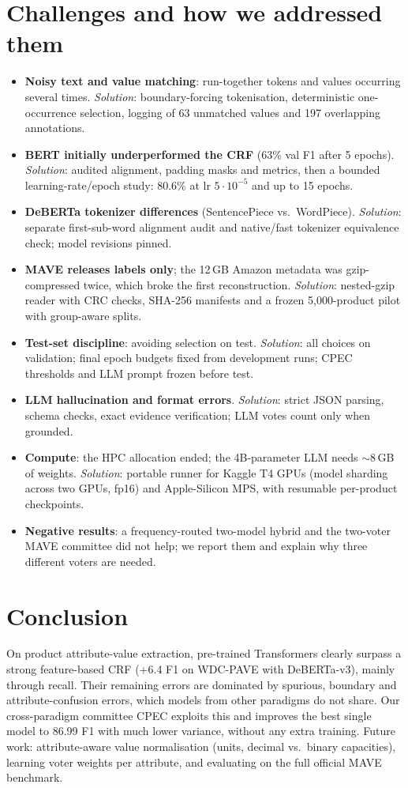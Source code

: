 \documentclass[10pt,twocolumn,a4paper]{article}
\begin{document}
\section{Challenges and how we addressed them}
\begin{itemize}
\item \textbf{Noisy text and value matching}: run-together tokens and values occurring several times. \emph{Solution}: boundary-forcing tokenisation, deterministic one-occurrence selection, logging of 63 unmatched values and 197 overlapping annotations.
\item \textbf{BERT initially underperformed the CRF} (63\% val F1 after 5 epochs). \emph{Solution}: audited alignment, padding masks and metrics, then a bounded learning-rate/epoch study: 80.6\% at lr $5\cdot10^{-5}$ and up to 15 epochs.
\item \textbf{DeBERTa tokenizer differences} (SentencePiece vs.\ WordPiece). \emph{Solution}: separate first-sub-word alignment audit and native/fast tokenizer equivalence check; model revisions pinned.
\item \textbf{MAVE releases labels only}; the 12\,GB Amazon metadata was gzip-compressed twice, which broke the first reconstruction. \emph{Solution}: nested-gzip reader with CRC checks, SHA-256 manifests and a frozen 5,000-product pilot with group-aware splits.
\item \textbf{Test-set discipline}: avoiding selection on test. \emph{Solution}: all choices on validation; final epoch budgets fixed from development runs; CPEC thresholds and LLM prompt frozen before test.
\item \textbf{LLM hallucination and format errors}. \emph{Solution}: strict JSON parsing, schema checks, exact evidence verification; LLM votes count only when grounded.
\item \textbf{Compute}: the HPC allocation ended; the 4B-parameter LLM needs $\sim$8\,GB of weights. \emph{Solution}: portable runner for Kaggle T4 GPUs (model sharding across two GPUs, fp16) and Apple-Silicon MPS, with resumable per-product checkpoints.
\item \textbf{Negative results}: a frequency-routed two-model hybrid and the two-voter MAVE committee did not help; we report them and explain why three different voters are needed.
\end{itemize}

\section{Conclusion}
On product attribute-value extraction, pre-trained Transformers clearly surpass a strong feature-based CRF (+6.4 F1 on WDC-PAVE with DeBERTa-v3), mainly through recall. Their remaining errors are dominated by spurious, boundary and attribute-confusion errors, which models from other paradigms do not share. Our cross-paradigm committee CPEC exploits this and improves the best single model to 86.99 F1 with much lower variance, without any extra training. Future work: attribute-aware value normalisation (units, decimal vs.\ binary capacities), learning voter weights per attribute, and evaluating on the full official MAVE benchmark.
\end{document}
